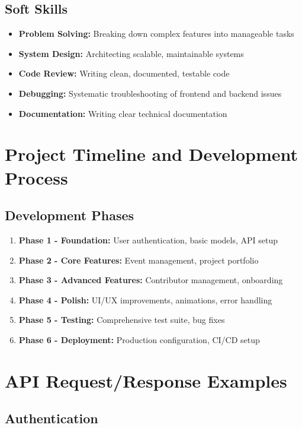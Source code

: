\documentclass[11pt,a4paper]{article}
\begin{document}
\subsection{Soft Skills}
\begin{itemize}[leftmargin=*]
    \item \textbf{Problem Solving:} Breaking down complex features into manageable tasks
    \item \textbf{System Design:} Architecting scalable, maintainable systems
    \item \textbf{Code Review:} Writing clean, documented, testable code
    \item \textbf{Debugging:} Systematic troubleshooting of frontend and backend issues
    \item \textbf{Documentation:} Writing clear technical documentation
\end{itemize}

\section{Project Timeline and Development Process}

\subsection{Development Phases}
\begin{enumerate}[leftmargin=*]
    \item \textbf{Phase 1 - Foundation:} User authentication, basic models, API setup
    \item \textbf{Phase 2 - Core Features:} Event management, project portfolio
    \item \textbf{Phase 3 - Advanced Features:} Contributor management, onboarding
    \item \textbf{Phase 4 - Polish:} UI/UX improvements, animations, error handling
    \item \textbf{Phase 5 - Testing:} Comprehensive test suite, bug fixes
    \item \textbf{Phase 6 - Deployment:} Production configuration, CI/CD setup
\end{enumerate}

\section{API Request/Response Examples}

\subsection{Authentication}
\end{document}
